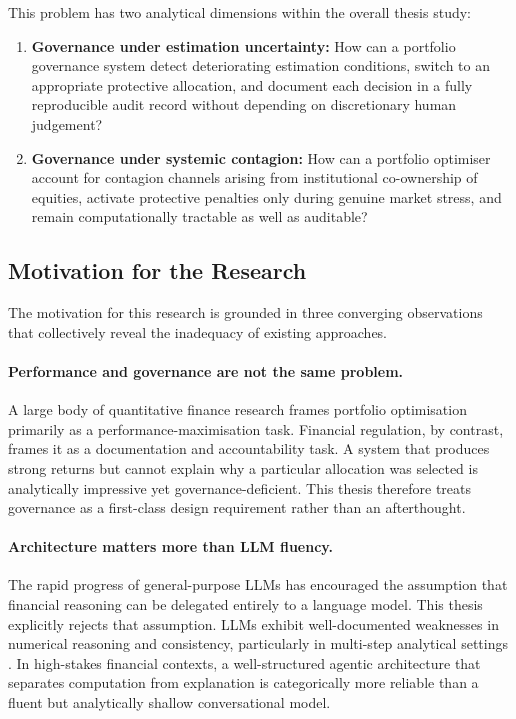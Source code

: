 \documentclass[11pt]{article}
\begin{document}
\noindent This problem has two analytical dimensions within the overall thesis study:

\begin{enumerate}
  \item \textbf{Governance under estimation uncertainty:} How can a portfolio governance system detect deteriorating estimation conditions, switch to an appropriate protective allocation, and document each decision in a fully reproducible audit record without depending on discretionary human judgement?
  \item \textbf{Governance under systemic contagion:} How can a portfolio optimiser account for contagion channels arising from institutional co-ownership of equities, activate protective penalties only during genuine market stress, and remain computationally tractable as well as auditable?
\end{enumerate}

\subsection{Motivation for the Research}
The motivation for this research is grounded in three converging observations that collectively reveal the inadequacy of existing approaches.

\paragraph{Performance and governance are not the same problem.} A large body of quantitative finance research frames portfolio optimisation primarily as a performance-maximisation task. Financial regulation, by contrast, frames it as a documentation and accountability task. A system that produces strong returns but cannot explain why a particular allocation was selected is analytically impressive yet governance-deficient. This thesis therefore treats governance as a first-class design requirement rather than an afterthought.

\paragraph{Architecture matters more than LLM fluency.} The rapid progress of general-purpose LLMs has encouraged the assumption that financial reasoning can be delegated entirely to a language model. This thesis explicitly rejects that assumption. LLMs exhibit well-documented weaknesses in numerical reasoning and consistency, particularly in multi-step analytical settings \cite{ji2023}. In high-stakes financial contexts, a well-structured agentic architecture that separates computation from explanation is categorically more reliable than a fluent but analytically shallow conversational model.
\end{document}
